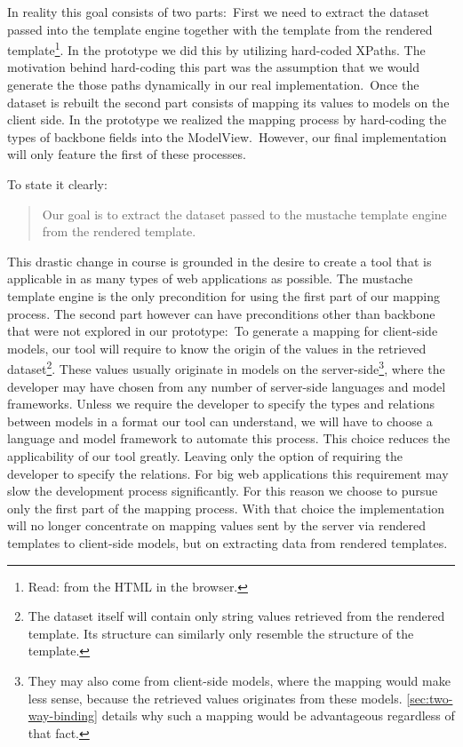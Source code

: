 \documentclass[thesis.tex]{subfiles}
\begin{document}
In reality this goal consists of two parts:\
First we need to extract the dataset passed into the template engine together
with the template from the rendered template\footnote{Read: from the HTML in the browser.}.
In the prototype we did this by utilizing hard-coded XPaths. The motivation
behind hard-coding this part was the assumption that we would generate the those
paths dynamically in our real implementation.\
Once the dataset is rebuilt the second part consists of mapping its values
to models on the client side. In the prototype we realized the mapping process
by hard-coding the types of backbone fields into the ModelView.\
However, our final implementation will only feature the first of these
processes.

To state it clearly:
\begin{quote}
Our goal is to extract the dataset passed to the mustache template engine from
the rendered template.
\end{quote}

This drastic change in course is grounded in the desire to create a tool that
is applicable in as many types of web applications as possible.
The mustache template engine is the only precondition for using the first part
of our mapping process. The second part however can have preconditions
other than backbone that were not explored in our prototype:\
To generate a mapping for client-side models, our tool will require to know the
origin of the values in the retrieved dataset\footnote{
	The dataset itself will contain only string values retrieved from the rendered
	template. Its structure can similarly only resemble the structure of the
	template.
}. These values usually originate in models on the server-side\footnote{
	They may also come from client-side models, where the mapping would make less
	sense, because the retrieved values originates from these models.
	\ref{sec:two-way-binding} details why such a mapping would be advantageous
	regardless of that fact.
}, where the developer may have chosen from any number of server-side languages
and model frameworks. Unless we require the developer to specify the types and
relations between models in a format our tool can understand, we will have to
choose a language and model framework to automate this process. This choice
reduces the applicability of our tool greatly. Leaving only the option of
requiring the developer to specify the relations. For big web applications this
requirement may slow the development process significantly.
For this reason we choose to pursue only the first part of the mapping process.
With that choice the implementation will no longer concentrate on mapping values
sent by the server via rendered templates to client-side models,
but on extracting data from rendered templates.
\end{document}
